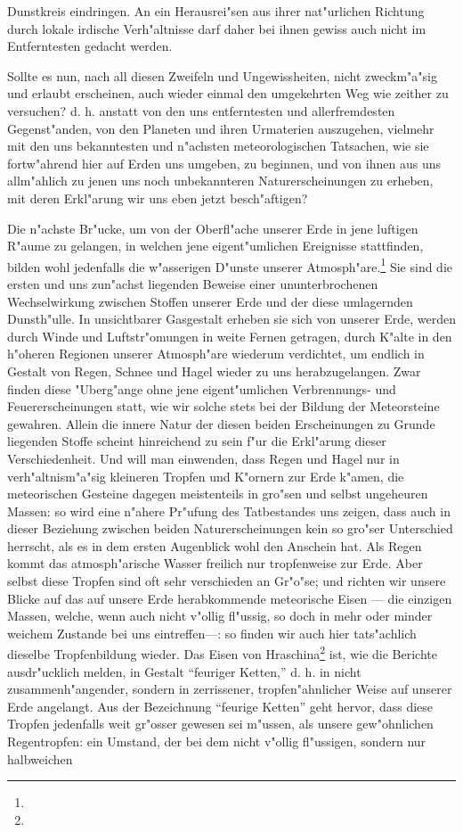 \documentclass[a4paper, 8pt, oneside, polutonikogreek, german]{article}
\begin{document}
Dunstkreis eindringen. An ein Herausrei"sen aus ihrer nat"urlichen Richtung durch lokale irdische Verh"altnisse darf daher bei ihnen gewiss auch nicht im Entferntesten gedacht werden.

Sollte es nun, nach all diesen Zweifeln und Ungewissheiten, nicht zweckm"a"sig und erlaubt erscheinen, auch wieder einmal den umgekehrten Weg wie zeither zu versuchen? d. h. anstatt von den uns entferntesten und allerfremdesten Gegenst"anden, von den Planeten und ihren Urmaterien auszugehen, vielmehr mit den uns bekanntesten und n"achsten meteorologischen Tatsachen, wie sie fortw"ahrend hier auf Erden uns umgeben, zu beginnen, und von ihnen aus uns allm"ahlich zu jenen uns noch unbekannteren Naturerscheinungen zu erheben, mit deren Erkl"arung wir uns eben jetzt besch"aftigen?

Die n"achste Br"ucke, um von der Oberfl"ache unserer Erde in jene luftigen R"aume zu gelangen, in welchen jene eigent"umlichen Ereignisse stattfinden, bilden wohl jedenfalls die w"asserigen D"unste unserer Atmosph"are.\footnote{} Sie sind die ersten und uns zun"achst liegenden Beweise einer ununterbrochenen Wechselwirkung zwischen Stoffen unserer Erde und der diese umlagernden Dunsth"ulle. In unsichtbarer Gasgestalt erheben sie sich von unserer Erde, werden durch Winde und Luftstr"omungen in weite Fernen getragen, durch K"alte in den h"oheren Regionen unserer Atmosph"are wiederum verdichtet, um endlich in Gestalt von Regen, Schnee und Hagel wieder zu uns herabzugelangen. Zwar finden diese "Uberg"ange ohne jene eigent"umlichen Verbrennungs- und Feuererscheinungen statt, wie wir solche stets bei der Bildung der Meteorsteine gewahren. Allein die innere Natur der diesen beiden Erscheinungen zu Grunde liegenden Stoffe scheint hinreichend zu sein f"ur die Erkl"arung dieser Verschiedenheit. Und will man einwenden, dass Regen und Hagel nur in verh"altnism"a"sig kleineren Tropfen und K"ornern zur Erde k"amen, die meteorischen Gesteine dagegen meistenteils in gro"sen und selbst ungeheuren Massen: so wird eine n"ahere Pr"ufung des Tatbestandes uns zeigen, dass auch in dieser Beziehung zwischen beiden Naturerscheinungen kein so gro"ser Unterschied herrscht, als es in dem ersten Augenblick wohl den Anschein hat. Als Regen kommt das atmosph"arische Wasser freilich nur tropfenweise zur Erde. Aber selbst diese Tropfen sind oft sehr verschieden an Gr"o"se; und richten wir unsere Blicke auf das auf unsere Erde herabkommende meteorische Eisen --- die einzigen Massen, welche, wenn auch nicht v"ollig fl"ussig, so doch in mehr oder minder weichem Zustande bei uns eintreffen---: so finden wir auch hier tats"achlich dieselbe Tropfenbildung wieder. Das Eisen von Hraschina\footnote{} ist, wie die Berichte ausdr"ucklich melden, in Gestalt "`feuriger Ketten,"' d. h. in nicht zusammenh"angender, sondern in zerrissener, tropfen"ahnlicher Weise auf unserer Erde angelangt. Aus der Bezeichnung "`feurige Ketten"' geht hervor, dass diese Tropfen jedenfalls weit gr"osser gewesen sei m"ussen, als unsere gew"ohnlichen Regentropfen: ein Umstand, der bei dem nicht v"ollig fl"ussigen, sondern nur halbweichen 
\end{document}
